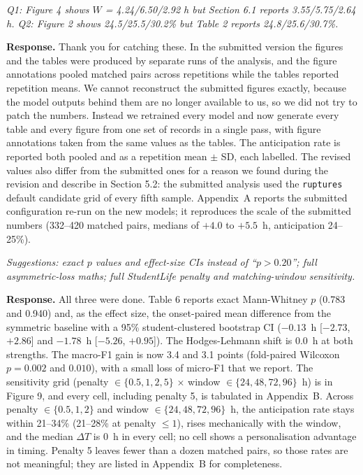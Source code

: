 \documentclass[11pt]{article}
\newenvironment{comment}{\par\medskip\noindent\begin{minipage}{\linewidth}\itshape\color{black!70}}{\end{minipage}\par\smallskip}
\newcommand{\dt}{$\Delta T$}
\newcommand{\resp}{\noindent\textbf{Response.} }
\begin{document}
\begin{comment}Q1: Figure 4 shows $W$ = 4.24/6.50/2.92 h but Section 6.1
reports 3.55/5.75/2.64 h. Q2: Figure 2 shows 24.5/25.5/30.2\% but Table 2
reports 24.8/25.6/30.7\%.\end{comment}
\resp Thank you for catching these. In the submitted version the
figures and the tables were produced by separate runs of the analysis,
and the figure annotations pooled matched pairs across repetitions
while the tables reported repetition means. We cannot reconstruct the
submitted figures exactly, because the model outputs behind them are no
longer available to us, so we did not try to patch the numbers. Instead
we retrained every model and now generate every table and every figure
from one set of records in a single pass, with figure annotations taken
from the same values as the tables. The anticipation rate is reported
both pooled and as a repetition mean $\pm$ SD, each labelled. The
revised values also differ from the submitted ones for a reason we
found during the revision and describe in Section 5.2: the submitted
analysis used the \texttt{ruptures} default candidate grid of every
fifth sample. Appendix~A reports the submitted configuration re-run on
the new models; it reproduces the scale of the submitted numbers
(332--420 matched pairs, medians of $+4.0$ to $+5.5$~h, anticipation
24--25\%).

\begin{comment}Suggestions: exact $p$ values and effect-size CIs instead
of ``$p>0.20$''; full asymmetric-loss maths; full StudentLife penalty and
matching-window sensitivity.\end{comment}
\resp All three were done. Table 6 reports exact Mann-Whitney $p$
(0.783 and 0.940) and, as the effect size, the onset-paired mean
difference from the symmetric baseline with a 95\% student-clustered
bootstrap CI ($-0.13$~h [$-2.73$, $+2.86$] and $-1.78$~h [$-5.26$,
$+0.95$]). The Hodges-Lehmann shift is 0.0~h at both strengths. The
macro-F1 gain is now 3.4 and 3.1 points (fold-paired Wilcoxon
$p = 0.002$ and $0.010$), with a small loss of micro-F1 that we report. The sensitivity grid (penalty
$\in\{0.5,1,2,5\}$ $\times$ window $\in\{24,48,72,96\}$~h) is in
Figure 9, and every cell, including penalty 5, is tabulated in
Appendix~B. Across penalty $\in \{0.5, 1, 2\}$ and window
$\in \{24, 48, 72, 96\}$~h, the anticipation rate stays within
21--34\% (21--28\% at penalty $\leq 1$), rises mechanically with the
window, and the median \dt{} is
0~h in every cell; no cell shows a personalisation advantage in timing.
Penalty 5 leaves fewer than a dozen matched pairs, so those rates are
not meaningful; they are listed in Appendix~B for completeness.
\end{document}
